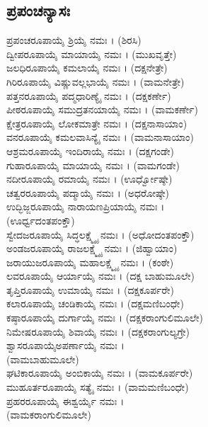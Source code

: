 \subsection{ಪ್ರಪಂಚನ್ಯಾಸಃ}
 ಪ್ರಪಂಚರೂಪಾಯೈ ಶ್ರಿಯೈ ನಮಃ । (ಶಿರಸಿ)\\
 ದ್ವೀಪರೂಪಾಯೈ ಮಾಯಾಯೈ ನಮಃ । (ಮುಖವೃತ್ತೇ)\\
 ಜಲಧಿರೂಪಾಯೈ ಕಮಲಾಯೈ ನಮಃ । (ದಕ್ಷನೇತ್ರೇ)\\
 ಗಿರಿರೂಪಾಯೈ ವಿಷ್ಣುವಲ್ಲಭಾಯೈ ನಮಃ । (ವಾಮನೇತ್ರೇ)\\
 ಪತ್ತನರೂಪಾಯೈ ಪದ್ಮಧಾರಿಣ್ಯೈ ನಮಃ । (ದಕ್ಷಕರ್ಣೇ)\\
 ಪೀಠರೂಪಾಯೈ ಸಮುದ್ರತನಯಾಯೈ ನಮಃ । (ವಾಮಕರ್ಣೇ)\\
 ಕ್ಷೇತ್ರರೂಪಾಯೈ ಲೋಕಮಾತ್ರೇ ನಮಃ । (ದಕ್ಷನಾಸಾಯಾಂ)\\
 ವನರೂಪಾಯೈ ಕಮಲವಾಸಿನ್ಯೈ ನಮಃ । (ವಾಮನಾಸಾಯಾಂ)\\
 ಆಶ್ರಮರೂಪಾಯೈ ಇಂದಿರಾಯೈ ನಮಃ । (ದಕ್ಷಗಂಡೇ)\\
 ಗುಹಾರೂಪಾಯೈ ಮಾಯಾಯೈ ನಮಃ । (ವಾಮಗಂಡೇ)\\
 ನದೀರೂಪಾಯೈ ರಮಾಯೈ ನಮಃ । (ಊರ್ಧ್ವೋಷ್ಠೇ)\\
 ಚತ್ವರರೂಪಾಯೈ ಪದ್ಮಾಯೈ ನಮಃ । (ಅಧರೋಷ್ಠೇ)\\
 ಉದ್ಭಿಜ್ಜರೂಪಾಯೈ ನಾರಾಯಣಪ್ರಿಯಾಯೈ ನಮಃ ।\\ (ಊರ್ಧ್ವದಂತಪಂಕ್ತೌ)\\
 ಸ್ವೇದಜರೂಪಾಯೈ ಸಿದ್ಧಲಕ್ಷ್ಮ್ಯೈ ನಮಃ । (ಅಧೋದಂತಪಂಕ್ತೌ)\\
 ಅಂಡಜರೂಪಾಯೈ ರಾಜಲಕ್ಷ್ಮ್ಯೈ ನಮಃ । (ಜಿಹ್ವಾಯಾಂ)\\
 ಜರಾಯುಜರೂಪಾಯೈ ಮಹಾಲಕ್ಷ್ಮ್ಯೈ ನಮಃ । (ಕಂಠೇ)\\
 ಲವರೂಪಾಯೈ ಆರ್ಯಾಯೈ ನಮಃ । (ದಕ್ಷ ಬಾಹುಮೂಲೇ)\\
 ತೃಪ್ತಿರೂಪಾಯೈ ಉಮಾಯೈ ನಮಃ । (ದಕ್ಷಕೂರ್ಪರೇ)\\
 ಕಲಾರೂಪಾಯೈ ಚಂಡಿಕಾಯೈ ನಮಃ । (ದಕ್ಷಮಣಿಬಂಧೇ)\\
 ಕಷ್ಠಾರೂಪಾಯೈ ದುರ್ಗಾಯೈ ನಮಃ । (ದಕ್ಷಕರಾಂಗುಲಿಮೂಲೇ)\\
 ನಿಮೇಷರೂಪಾಯೈ ಶಿವಾಯೈ ನಮಃ । (ದಕ್ಷಕರಾಂಗುಲ್ಯಗ್ರೇ)\\
 ಶ್ವಾಸರೂಪಾಯೈಅಪರ್ಣಾಯೈ ನಮಃ ।\\ (ವಾಮಬಾಹುಮೂಲೇ)\\
 ಘಟಿಕಾರೂಪಾಯೈ ಅಂಬಿಕಾಯೈ ನಮಃ । (ವಾಮಕೂರ್ಪರೇ)\\
 ಮುಹೂರ್ತರೂಪಾಯೈ ಸತ್ಯೈ ನಮಃ । (ವಾಮಮಣಿಬಂಧೇ)\\
 ಪ್ರಹರರೂಪಾಯೈ ಈಶ್ವರ್ಯೈ ನಮಃ । \\(ವಾಮಕರಾಂಗುಲಿಮೂಲೇ)\\
